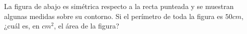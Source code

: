 La figura de abajo es simétrica respecto a la recta punteada y se muestran algunas medidas sobre su contorno.
Si el perímetro de toda la figura es $50cm$, ¿cuál es, en $cm^2$, el área de la figura?